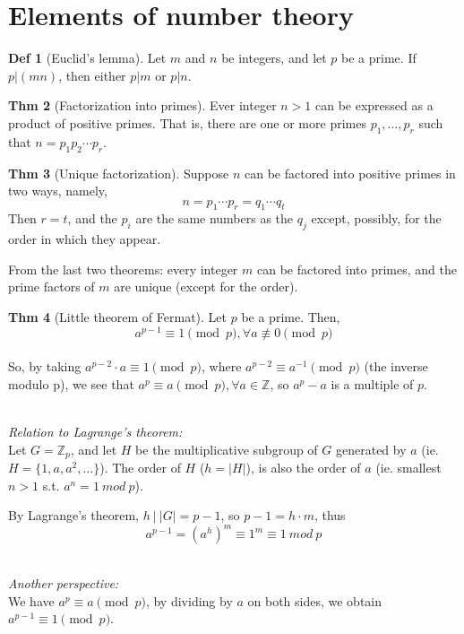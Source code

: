 \documentclass{article}
\theoremstyle{definition}
\newtheorem{definition}{Def}[section]
\newtheorem{theorem}[definition]{Thm}
\begin{document}
\section{Elements of number theory}

\begin{definition}[Euclid's lemma]
    Let $m$ and $n$ be integers, and let $p$ be a prime. If $p|(mn)$, then either $p|m$ or $p|n$.
\end{definition}

\begin{theorem}[Factorization into primes]
    Ever integer $n>1$ can be expressed as a product of positive primes. That is, there are one or more primes $p_1, \ldots, p_r$ such that $n=p_1 p_2 \cdots p_r$.
\end{theorem}

\begin{theorem}[Unique factorization]
    Suppose $n$ can be factored into positive primes in two ways, namely,
    $$n= p_1 \cdots p_r = q_1 \cdots q_t$$
    Then $r=t$, and the $p_i$ are the same numbers as the $q_j$ except, possibly, for the order in which they appear.
\end{theorem}

From the last two theorems: every integer $m$ can be factored into primes, and the prime factors of $m$ are unique (except for the order).

\begin{theorem}[Little theorem of Fermat]
    Let $p$ be a prime. Then,
    $$a^{p-1} \equiv 1 \pmod p, \forall a \not\equiv 0 \pmod p$$
    \\
    So, by taking $a^{p-2} \cdot a \equiv 1 \pmod p$, where $a^{p-2} \equiv a^{-1} \pmod p$ (the inverse modulo p), we see that $a^p \equiv a \pmod p, \forall a \in \mathbb{Z}$, so $a^p - a$ is a multiple of $p$.

    ~\\\emph{Relation to Lagrange's theorem:}\\
    Let $G = \mathbb{Z}_p$, and let $H$ be the multiplicative subgroup of $G$ generated by $a$ (ie. $H = \{ 1, a, a^2, \ldots \}$). The order of $H$ ($h = |H|$), is also the order of $a$ (ie. smallest $n>1$ s.t. $a^n=1~mod~p$).

    By Lagrange's theorem, $h~|~|G| = p - 1$, so $p-1 = h \cdot m$, thus
    $$
    a^{p-1} = (a^h)^m \equiv 1^m \equiv 1~mod~p
    $$

    ~\\\emph{Another perspective:}\\
    We have $a^p \equiv a \pmod{p}$, by dividing by $a$ on both sides, we obtain $a^{p-1} \equiv 1 \pmod{p}$.

\end{theorem}
\end{document}
